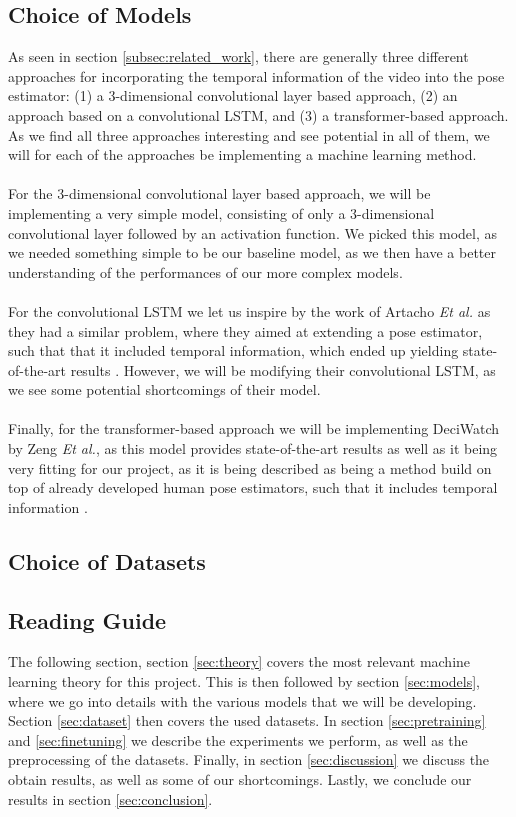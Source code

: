 \documentclass[./main.tex]{subfiles}
\begin{document}
\subsection{Choice of Models}
\label{sec:model_choice}
As seen in section \ref{subsec:related_work}, there are generally three different approaches for incorporating the temporal information of the video into the pose estimator: (1) a 3-dimensional convolutional layer based approach, (2) an approach based on a convolutional LSTM, and (3) a transformer-based approach. As we find all three approaches interesting and see potential in all of them, we will for each of the approaches be implementing a machine learning method.
\\
\\
For the 3-dimensional convolutional layer based approach, we will be implementing a very simple model, consisting of only a 3-dimensional convolutional layer followed by an activation function. We picked this model, as we needed something simple to be our baseline model, as we then have a better understanding of the performances of our more complex models.
\\
\\
For the convolutional LSTM we let us inspire by the work of Artacho \textit{Et al.} as they had a similar problem, where they aimed at extending a pose estimator, such that that it included temporal information, which ended up yielding state-of-the-art results \cite{https://doi.org/10.48550/arxiv.2001.08095}. However, we will be modifying their convolutional LSTM, as we see some potential shortcomings of their model.
\\
\\
Finally, for the transformer-based approach we will be implementing DeciWatch by Zeng \textit{Et al.}, as this model provides state-of-the-art results as well as it being very fitting for our project, as it is being described as being a method build on top of already developed human pose estimators, such that it includes temporal information \cite{https://doi.org/10.48550/arxiv.2203.08713}.

\subsection{Choice of Datasets}

\subsection{Reading Guide}
The following section, section \ref{sec:theory} covers the most relevant machine learning theory for this project. This is then followed by section \ref{sec:models}, where we go into details with the various models that we will be developing. Section \ref{sec:dataset} then covers the used datasets. In section \ref{sec:pretraining} and \ref{sec:finetuning} we describe the experiments we perform, as well as the preprocessing of the datasets. Finally, in section \ref{sec:discussion} we discuss the obtain results, as well as some of our shortcomings. Lastly, we conclude our results in section \ref{sec:conclusion}.
\end{document}
